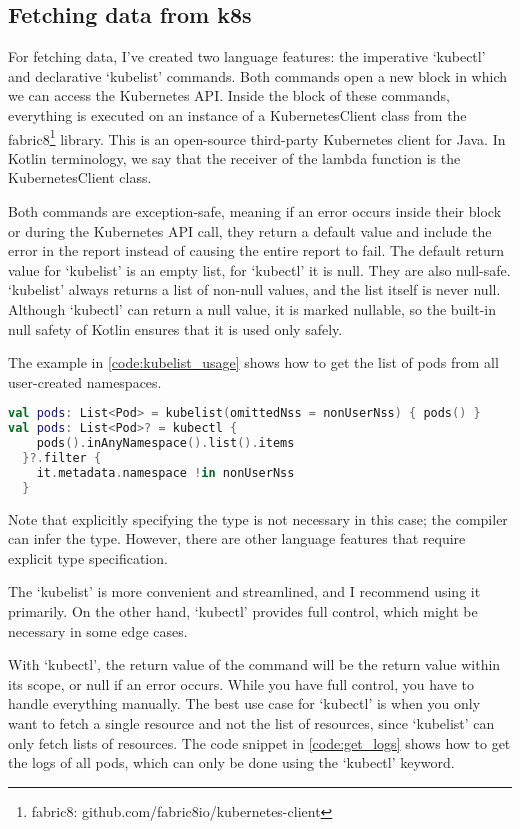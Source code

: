 \subsection{Fetching data from k8s}

For fetching data, I've created two language features: the imperative `kubectl' and declarative `kubelist' commands. Both commands open a new block in which we can access the Kubernetes API. Inside the block of these commands, everything is executed on an instance of a KubernetesClient class from the fabric8\footnote{fabric8: github.com/fabric8io/kubernetes-client} library. This is an open-source third-party Kubernetes client for Java. In Kotlin terminology, we say that the receiver of the lambda function is the KubernetesClient class.

Both commands are exception-safe, meaning if an error occurs inside their block or during the Kubernetes API call, they return a default value and include the error in the report instead of causing the entire report to fail. The default return value for `kubelist' is an empty list, for `kubectl' it is null. They are also null-safe. `kubelist' always returns a list of non-null values, and the list itself is never null. Although `kubectl' can return a null value, it is marked nullable, so the built-in null safety of Kotlin ensures that it is used only safely.

The example in \ref{code:kubelist_usage} shows how to get the list of pods from all user-created namespaces.

\begin{lstlisting}[caption={Usage of kubelist and kubectl},language=Kotlin,label=code:kubelist_usage]
val pods: List<Pod> = kubelist(omittedNss = nonUserNss) { pods() }
val pods: List<Pod>? = kubectl { 
    pods().inAnyNamespace().list().items 
  }?.filter { 
    it.metadata.namespace !in nonUserNss 
  }
\end{lstlisting}

Note that explicitly specifying the type is not necessary in this case; the compiler can infer the type. However, there are other language features that require explicit type specification.

The `kubelist' is more convenient and streamlined, and I recommend using it primarily. On the other hand, `kubectl' provides full control, which might be necessary in some edge cases.

With `kubectl', the return value of the command will be the return value within its scope, or null if an error occurs. While you have full control, you have to handle everything manually. The best use case for `kubectl' is when you only want to fetch a single resource and not the list of resources, since `kubelist' can only fetch lists of resources. The code snippet in \ref{code:get_logs} shows how to get the logs of all pods, which can only be done using the `kubectl' keyword.


